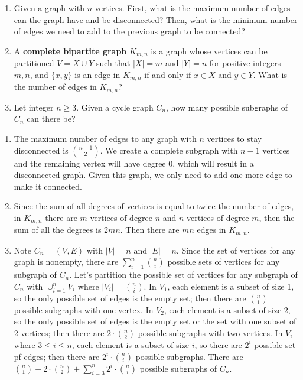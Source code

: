 \documentclass{article}
\theoremstyle{definition}
\begin{document}
\begin{question}
    
\begin{enumerate}
	\item Given a graph with $n$ vertices. First, what is the maximum number of edges can the graph have and be disconnected? Then, what is the minimum number of edges we need to add to the previous graph to be connected?
	\item A \textbf{complete bipartite graph} $K_{m,n}$ is a graph whose vertices can be partitioned $V=X\cup Y$ such that $|X|=m$ and  $|Y|=n$ for positive integers $m,n$, and $\{x, y\}$ is an edge in $K_{m,n}$ if and only if $x\in X$ and $y\in Y$. What is the number of edges in $K_{m,n}$?
	\item Let integer $n\geq 3$. Given a cycle graph $C_n$, how many possible subgraphs of $C_n$ can there be?
	\end{enumerate}
\end{question}
\begin{solution}
\begin{enumerate}
	\item The maximum number of edges to any graph with $n$ vertices to stay disconnected is $\binom{n-1}{2}$. We create a complete subgraph with $n-1$ vertices and the remaining vertex will have degree 0, which will result in a disconnected graph. Given this graph, we only need to add one more edge to make it connected.
	\item Since the sum of all degrees of vertices is equal to twice the number of edges, in $K_{m, n}$ there are $m$ vertices of degree $n$ and $n$ vertices of degree $m$, then the sum of all the degrees is $2mn$. Then there are $mn$ edges in $K_{m, n}$.
	\item Note $C_n = (V, E)$ with $|V|=n$ and $|E|=n$. Since the set of vertices for any graph is nonempty, there are $\displaystyle \sum_{i=1}^n \binom{n}{i}$ possible sets of vertices for any subgraph of $C_n$. Let's partition the possible set of vertices for any subgraph of $C_n$ with $\cup_{i=1}^n V_i$ where $|V_i|=\binom{n}{i}$. In $V_1$, each element is a subset of size 1, so the only possible set of edges is the empty set; then there are $\binom{n}{1}$ possible subgraphs with one vertex. In $V_2$, each element is a subset of size 2, so the only possible set of edges is the empty set or the set with one subset of 2 vertices; then there are $2\cdot \binom{n}{2}$ possible subgraphs with two vertices. In $V_i$ where $3\leq i\leq n$, each element is a subset of size $i$, so there are $2^i$ possible set pf edges; then there are $2^i \cdot \binom{n}{i}$ possible subgraphs. 
There are $\displaystyle \binom{n}{1} + 2\cdot\binom{n}{2} + \sum_{i=3}^n 2^i\cdot\binom{n}{i}$ possible subgraphs of $C_n$.
	

\end{enumerate}
\end{solution}
\end{document}
